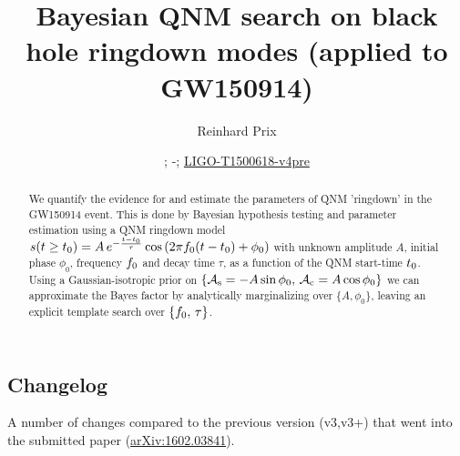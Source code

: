 \documentclass[aps,prd,onecolumn,notitlepage,nofootinbib,superscriptaddress,altaffilletter,floatfix]{revtex4-1}
\newcommand{\dcc}{LIGO-T1500618-v4pre}
\begin{document}
\title{Bayesian QNM search on black hole ringdown modes (applied to GW150914)}


\author{Reinhard Prix}
\date{\commitDATE; \commitIDshort-\commitSTATUS; \href{https://dcc.ligo.org/LIGO-T1500618}{\dcc}}


\begin{abstract}
  We quantify the evidence for and estimate the parameters of QNM 'ringdown' in the GW150914 event.
  This is done by Bayesian hypothesis testing and parameter estimation using a QNM ringdown model
  $s(t\ge t_0) = A\,e^{-\frac{t-t_0}{\tau}}\cos\left(2\pi f_0 (t-t_0) + \phi_0\right)$ with unknown amplitude $A$, initial phase $\phi_0$,
  frequency $f_0$ and decay time $\tau$, as a function of the QNM start-time $t_0$.
  Using a Gaussian-isotropic prior on $\{\mathcal{A}_{\mathrm{s}}=-A\sin\phi_0,\,\mathcal{A}_{\mathrm{c}}=A\cos\phi_0\}$ we can approximate the Bayes factor by analytically marginalizing over
  $\{A,\phi_0\}$, leaving an explicit template search over $\{f_0,\,\tau\}$.
\end{abstract}

\maketitle

\subsection{Changelog}
\label{sec:changelog}

A number of changes compared to the previous version (v3,v3+) that went into the submitted paper (\href{http://arxiv.org/abs/1602.03841}{arXiv:1602.03841}).
\end{document}
